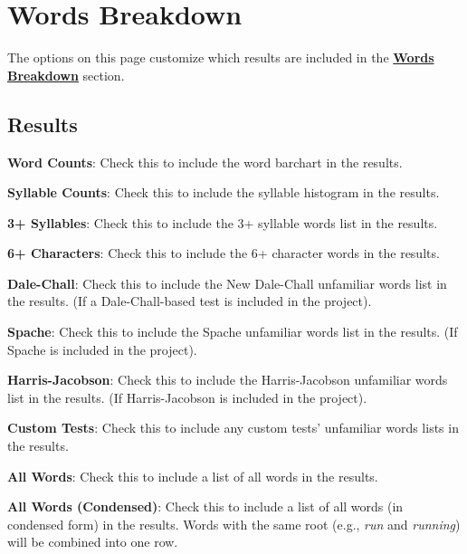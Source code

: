 \documentclass[
]{book}
\theoremstyle{definition}
\theoremstyle{definition}
\theoremstyle{definition}
\theoremstyle{definition}
\theoremstyle{remark}
\begin{document}
\hypertarget{options-words-breakdown}{%
\section{Words Breakdown}\label{options-words-breakdown}}

The options on this page customize which results are included in the \protect\hyperlink{reviewing-word-breakdowns}{\textbf{Words Breakdown}} section.

\hypertarget{results-1}{%
\subsection*{Results}\label{results-1}}

\textbf{Word Counts}: Check this to include the word barchart in the results.

\textbf{Syllable Counts}: Check this to include the syllable histogram in the results.

\textbf{3+ Syllables}: Check this to include the 3+ syllable words list in the results.

\textbf{6+ Characters}: Check this to include the 6+ character words in the results.

\textbf{Dale-Chall}: Check this to include the New Dale-Chall unfamiliar words list in the results. (If a Dale-Chall-based test is included in the project).

\textbf{Spache}: Check this to include the Spache unfamiliar words list in the results. (If Spache is included in the project).

\textbf{Harris-Jacobson}: Check this to include the Harris-Jacobson unfamiliar words list in the results. (If Harris-Jacobson is included in the project).

\textbf{Custom Tests}: Check this to include any custom tests' unfamiliar words lists in the results.

\textbf{All Words}: Check this to include a list of all words in the results.

\textbf{All Words (Condensed)}: Check this to include a list of all words (in condensed form) in the results. Words with the same root (e.g., \emph{run} and \emph{running}) will be combined into one row.

\newpage
\end{document}
